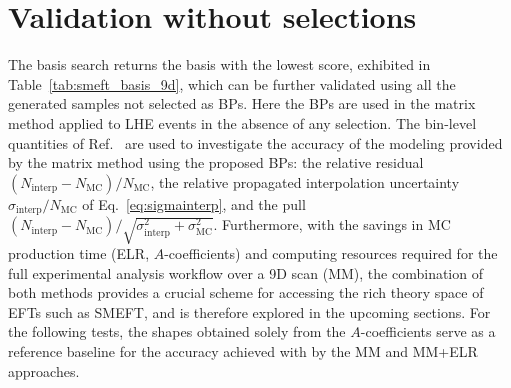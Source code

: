 \section{Validation without selections}
\label{sec:validation}


The basis search returns the basis with the lowest score, exhibited in Table~\ref{tab:smeft_basis_9d}, which can be further validated using all the generated samples not selected as BPs. Here the BPs are used in the matrix method applied to LHE events in the absence of any selection. The bin-level quantities of Ref.~\cite{HH_nonggf_R5} are used to investigate the accuracy of the modeling provided by the matrix method using the proposed BPs: the relative residual $(N_\mathrm{interp}-N_\mathrm{MC})/N_\mathrm{MC}$, the relative propagated interpolation uncertainty $\sigma_\mathrm{interp}/N_\mathrm{MC}$ of Eq.~\eqref{eq:sigmainterp}, and the pull $(N_\mathrm{interp}-N_\mathrm{MC})/\sqrt{\sigma^2_\mathrm{interp}+\sigma^2_\mathrm{MC}}$. Furthermore, with the savings in MC production time (ELR, $A$-coefficients) and computing resources required for the full experimental analysis workflow over a 9D scan (MM), the combination of both methods provides a crucial scheme for accessing the rich theory space of EFTs such as SMEFT, and is therefore explored in the upcoming sections. For the following tests, the shapes obtained solely from the $A$-coefficients serve as a reference baseline for the accuracy achieved with by the MM and MM+ELR approaches.



